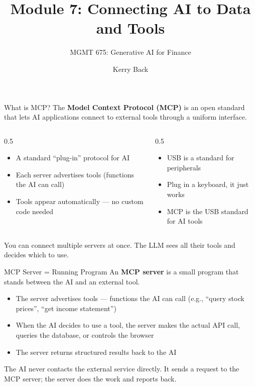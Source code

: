 \documentclass[aspectratio=169]{beamer}
\subtitle{MGMT 675: Generative AI for Finance}
\title{Module 7: Connecting AI to Data and Tools}
\author{Kerry Back}
\date{}
\begin{document}
\maketitle

\begin{frame}{What is MCP?}
The \textbf{Model Context Protocol (MCP)} is an open standard that lets AI applications connect to external tools through a uniform interface.
\vspace{0.3cm}
\begin{columns}[T]
\begin{column}{0.5\textwidth}
\begin{shadedbox}[title=\textbf{The Idea}]
\begin{itemize}\small
  \item A standard ``plug-in'' protocol for AI
  \item Each server advertises tools (functions the AI can call)
  \item Tools appear automatically --- no custom code needed
\end{itemize}
\end{shadedbox}
\end{column}
\begin{column}{0.5\textwidth}
\begin{shadedbox}[title=\textbf{Analogy}]
\begin{itemize}\small
  \item USB is a standard for peripherals
  \item Plug in a keyboard, it just works
  \item MCP is the USB standard for AI tools
\end{itemize}
\end{shadedbox}
\end{column}
\end{columns}
\vspace{0.3cm}
You can connect multiple servers at once.  The LLM sees all their tools and decides which to use.
\end{frame}

\begin{frame}{MCP Server = Running Program}
An \textbf{MCP server} is a small program that stands between the AI and an external tool.
\vspace{0.3cm}
\begin{itemize}
  \item The server \alert{advertises tools} --- functions the AI can call (e.g., ``query stock prices'', ``get income statement'')
  \item When the AI decides to use a tool, the server \alert{makes the actual API call}, queries the database, or controls the browser
  \item The server returns structured results back to the AI
\end{itemize}
\vspace{0.3cm}
The AI never contacts the external service directly.  It sends a request to the MCP server; the server does the work and reports back.
\end{frame}
\end{document}
